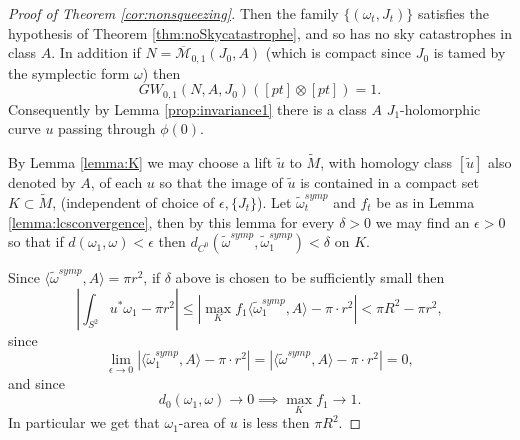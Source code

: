 \documentclass{amsart}
\numberwithin{equation}{section}
\theoremstyle{definition}
\theoremstyle{remark}
\begin{document}
\begin{proof} [Proof of Theorem \ref{cor:nonsqueezing}]
 Then the family $\{(\omega _{t}, J _{t}  )\}$ satisfies the hypothesis of Theorem \ref{thm:noSkycatastrophe}, and so has no sky catastrophes in class $A$. In addition if $N = \overline{\mathcal{M}} _{0,1}   (J _{0}, A)$ (which is compact since $J _{0} $ is tamed by the symplectic form $\omega$)  then
\begin{equation*}
GW _{0,1} (N,A,J _{0} ) ([pt] \otimes [pt]) =1.
\end{equation*}
Consequently by Lemma \ref{prop:invariance1} there is a class $A$ $J _{1}$-holomorphic curve $u$ passing through $\phi ({0}) $.  

   By Lemma \ref{lemma:K} we may choose a lift $\widetilde{u} $ to $\widetilde{M} $, with homology class $[\widetilde{u} ]$ also denoted by $A$, of each $u$ so that the image of $\widetilde{u} $ is contained in a compact set $K \subset \widetilde{M} $, (independent of choice of $\epsilon, \{J _{t} \}$). 
Let $\widetilde{\omega} ^{symp} _{t} $ and $f _{t} $ be as in Lemma \ref{lemma:lcsconvergence}, 
then by this lemma for every $\delta > 0$ we may find an $\epsilon>0$
so that if $d(\omega _{1}, \omega)< \epsilon$ then $d _{C ^{0}} (\widetilde{\omega} ^{symp},  \widetilde{\omega} _{1} ^{symp}) <\delta$ on $K$.


 Since $  \langle \widetilde{\omega} ^{symp}, A  \rangle =\pi r ^{2}  $, if $\delta$ above is chosen to be sufficiently small then $$|\int _{S ^{2}} u ^{*} \omega _{1} - \pi r ^{2}    | \leq  |\max _{K} f _{1} \langle \widetilde{\omega} _{1}  ^{symp}, A  \rangle - \pi \cdot r ^{2}  | < \pi R ^{2} - \pi r^{2},   $$   
   since $$   \lim _{\epsilon \to 0} |\langle \widetilde{\omega} _{1}  ^{symp}, A  \rangle - \pi \cdot r ^{2}| = |\langle \widetilde{\omega}   ^{symp}, A  \rangle - \pi \cdot r ^{2}| = 0,$$ and since 
   $$
d _{0}  (\omega _{1}, \omega ) \to 0 \implies \max _{K} f _{1} \to 1 .$$
In particular we get that $\omega _{1} $-area of $u$ is less then $\pi R ^{2} $.



%
%     
%


\end{proof}
\end{document}
